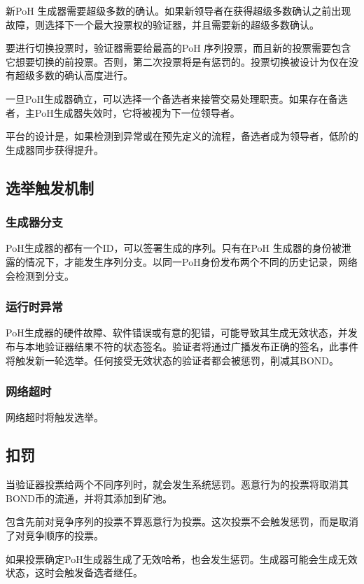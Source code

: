 \documentclass[12pt, uft8]{ctexart}
\begin{document}
新PoH 生成器需要超级多数的确认。如果新领导者在获得超级多数确认之前出现故障，则选择下一个最大投票权的验证器，并且需要新的超级多数确认。

要进行切换投票时，验证器需要给最高的PoH 序列投票，而且新的投票需要包含它想要切换的前投票。否则，第二次投票将是有惩罚的。投票切换被设计为仅在没有超级多数的确认高度进行。

一旦PoH生成器确立，可以选择一个备选者来接管交易处理职责。如果存在备选者，主PoH生成器失效时，它将被视为下一位领导者。

平台的设计是，如果检测到异常或在预先定义的流程，备选者成为领导者，低阶的生成器同步获得提升。

\subsection{选举触发机制}
\subsubsection{生成器分支}

PoH生成器的都有一个ID，可以签署生成的序列。只有在PoH 生成器的身份被泄露的情况下，才能发生序列分支。以同一PoH身份发布两个不同的历史记录，网络会检测到分支。

\subsubsection{运行时异常}
PoH生成器的硬件故障、软件错误或有意的犯错，可能导致其生成无效状态，并发布与本地验证器结果不符的状态签名。验证者将通过广播发布正确的签名，此事件将触发新一轮选举。任何接受无效状态的验证者都会被惩罚，削减其BOND。

\subsubsection{网络超时}

网络超时将触发选举。

\subsection{扣罚}
当验证器投票给两个不同序列时，就会发生系统惩罚。恶意行为的投票将取消其BOND币的流通，并将其添加到矿池。

包含先前对竞争序列的投票不算恶意行为投票。这次投票不会触发惩罚，而是取消了对竞争顺序的投票。

如果投票确定PoH生成器生成了无效哈希，也会发生惩罚。生成器可能会生成无效状态，这时会触发备选者继任。
\end{document}
